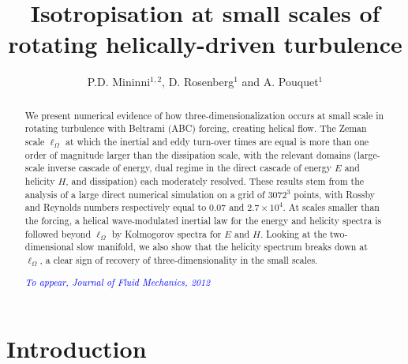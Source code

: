\documentclass[aps,amsmath,amssymb,floatfix,showpacs]{revtex4}
\def\ADD#1{{\textcolor{blue}{#1}}}         %
\begin{document}
\title %
{Isotropisation at small scales of rotating helically-driven turbulence}

\author{P.D. Mininni$^{1,2}$, D. Rosenberg$^1$ and A. Pouquet$^1$}

\begin{abstract}
We present numerical evidence of how three-dimensionalization occurs at small scale in rotating turbulence with Beltrami (ABC) forcing, creating helical flow. The Zeman scale $\ell_{\Omega}$ at which the inertial and eddy turn-over times are equal is more than one order of magnitude larger than the dissipation scale, with the relevant domains (large-scale inverse cascade of energy, dual regime in the direct cascade of energy $E$ and helicity $H$, and dissipation) each moderately resolved. These results stem from the analysis of a large direct numerical simulation on a grid of $3072^3$ points, with Rossby and Reynolds numbers respectively equal to $0.07$ and $2.7\times 10^4$. At scales smaller than the forcing, a helical wave-modulated inertial law for the energy and helicity spectra is followed beyond $\ell_{\Omega}$ by Kolmogorov spectra for $E$ and $H$. Looking at the two-dimensional slow manifold, we also show that the helicity spectrum breaks down at $\ell_{\Omega}$, a clear sign of recovery of three-dimensionality in the small scales.

\ADD{{\it To appear, Journal of Fluid Mechanics, 2012}}
\end{abstract}
\maketitle


\section{Introduction}\label{sec:intro}
\end{document}
